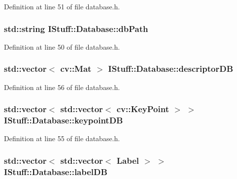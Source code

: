 Definition at line 51 of file database.\-h.

\hypertarget{class_i_stuff_1_1_database_ae648dcc6da59f19955681584028fef99}{
\subsubsection[{db\-Path}]{\setlength{\rightskip}{0pt plus 5cm}std\-::string I\-Stuff\-::\-Database\-::db\-Path\hspace{0.3cm}{\ttfamily [private]}}}\label{class_i_stuff_1_1_database_ae648dcc6da59f19955681584028fef99}


Definition at line 50 of file database.\-h.

\hypertarget{class_i_stuff_1_1_database_a6af39e0cf95b7a14c331911bf388bf65}{
\subsubsection[{descriptor\-D\-B}]{\setlength{\rightskip}{0pt plus 5cm}std\-::vector$<$ cv\-::\-Mat $>$ I\-Stuff\-::\-Database\-::descriptor\-D\-B\hspace{0.3cm}{\ttfamily [private]}}}\label{class_i_stuff_1_1_database_a6af39e0cf95b7a14c331911bf388bf65}


Definition at line 56 of file database.\-h.

\hypertarget{class_i_stuff_1_1_database_a9e5ee68bf2517bcc87fa38b3519897ee}{
\subsubsection[{keypoint\-D\-B}]{\setlength{\rightskip}{0pt plus 5cm}std\-::vector$<$ std\-::vector$<$ cv\-::\-Key\-Point $>$ $>$ I\-Stuff\-::\-Database\-::keypoint\-D\-B\hspace{0.3cm}{\ttfamily [private]}}}\label{class_i_stuff_1_1_database_a9e5ee68bf2517bcc87fa38b3519897ee}


Definition at line 55 of file database.\-h.

\hypertarget{class_i_stuff_1_1_database_a6d83fe3176ec13b1847ab7600e8e230c}{
\subsubsection[{label\-D\-B}]{\setlength{\rightskip}{0pt plus 5cm}std\-::vector$<$ std\-::vector$<$ {\bf Label} $>$ $>$ I\-Stuff\-::\-Database\-::label\-D\-B\hspace{0.3cm}{\ttfamily [private]}}}\label{class_i_stuff_1_1_database_a6d83fe3176ec13b1847ab7600e8e230c}



